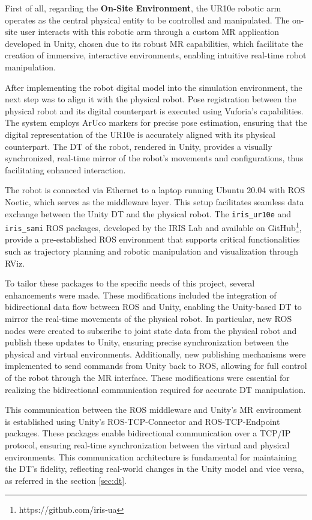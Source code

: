 First of all, regarding the \textbf{On-Site Environment}, the UR10e robotic arm operates as the central physical entity to be controlled and manipulated. The on-site user interacts with this robotic arm through a custom \ac{MR} application developed in Unity, chosen due to its robust \ac{MR} capabilities, which facilitate the creation of immersive, interactive environments, enabling intuitive real-time robot manipulation.

After implementing the robot digital model into the simulation environment, the next step was to align it with the physical robot. Pose registration between the physical robot and its digital counterpart is executed using Vuforia's capabilities. The system employs ArUco markers for precise pose estimation, ensuring that the digital representation of the UR10e is accurately aligned with its physical counterpart. The \ac{DT} of the robot, rendered in Unity, provides a visually synchronized, real-time mirror of the robot's movements and configurations, thus facilitating enhanced interaction.

The robot is connected via Ethernet to a laptop running Ubuntu 20.04 with \ac{ROS} Noetic, which serves as the middleware layer. This setup facilitates seamless data exchange between the Unity \ac{DT} and the physical robot. The \texttt{iris\_ur10e} and \texttt{iris\_sami} \ac{ROS} packages, developed by the IRIS Lab and available on GitHub\footnote{https://github.com/iris-ua}, provide a pre-established \ac{ROS} environment that supports critical functionalities such as trajectory planning and robotic manipulation and visualization through RViz.

To tailor these packages to the specific needs of this project, several enhancements were made. These modifications included the integration of bidirectional data flow between \ac{ROS} and Unity, enabling the Unity-based \ac{DT} to mirror the real-time movements of the physical robot. In particular, new \ac{ROS} nodes were created to subscribe to joint state data from the physical robot and publish these updates to Unity, ensuring precise synchronization between the physical and virtual environments. Additionally, new publishing mechanisms were implemented to send commands from Unity back to \ac{ROS}, allowing for full control of the robot through the \ac{MR} interface. These modifications were essential for realizing the bidirectional communication required for accurate \ac{DT} manipulation.

This communication between the \ac{ROS} middleware and Unity’s \ac{MR} environment is established using Unity’s \ac{ROS}-\ac{TCP}-Connector and \ac{ROS}-\ac{TCP}-Endpoint packages. These packages enable bidirectional communication over a \ac{TCP}/\ac{IP} protocol, ensuring real-time synchronization between the virtual and physical environments. This communication architecture is fundamental for maintaining the \ac{DT}'s fidelity, reflecting real-world changes in the Unity model and vice versa, as referred in the section \ref{sec:dt}.


